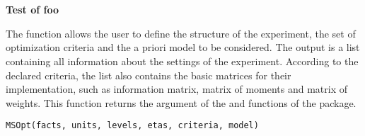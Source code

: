 \documentclass[a4paper]{book}
\begin{document}
\chapter*{}
\begin{center}
{\textbf{\huge Test of foo}}
\par\bigskip{\large \today}
\end{center}
%
\begin{Description}\relax
The  function allows the user to define the
structure of the experiment, the set of optimization criteria and the a priori
model to be considered. The output is a list containing all information about
the settings of the experiment. According to the declared criteria, the list
also contains the basic matrices for their implementation, such as
information matrix, matrix of moments and matrix of weights. This function
returns the  argument of the  and
 functions of the  package.
\end{Description}
%
\begin{Usage}
\begin{verbatim}
MSOpt(facts, units, levels, etas, criteria, model)
\end{verbatim}
\end{Usage}
%
\end{document}
